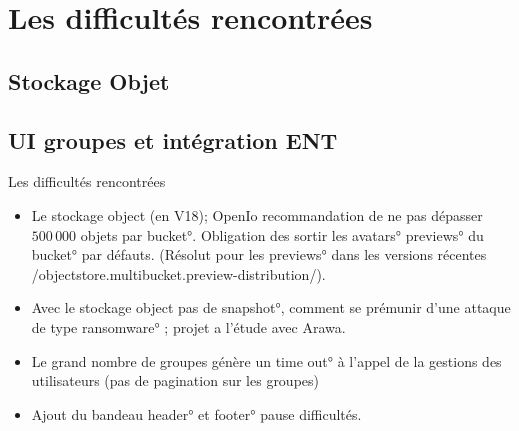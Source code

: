 
\section{Les difficultés rencontrées}
\subsection{Stockage Objet}
\subsection{UI groupes et intégration ENT}
\begin{frame}[fragile]{Les difficultés rencontrées}
\begin{itemize}

\item Le stockage object (en \small{V18});  OpenIo recommandation de ne pas dépasser $500\,000$ objets par \ang{bucket}. Obligation des sortir les \ang{avatars} \ang{previews} du \ang{bucket} par défauts. (Résolut pour les \ang{previews} dans les versions récentes \code/objectstore.multibucket.preview-distribution/).

\item Avec le stockage object pas de \ang{snapshot}, comment se prémunir d'une attaque de type \ang{ransomware} ; projet a l'étude avec Arawa. 

\end{itemize}


\begin{itemize}
\pause \item Le grand nombre de groupes génère un \ang{time out} à l'appel de la gestions des utilisateurs (pas de pagination sur les groupes)
\pause \item Ajout du bandeau \ang{header} et \ang{footer} pause difficultés. 
\end{itemize}

\end{frame}
